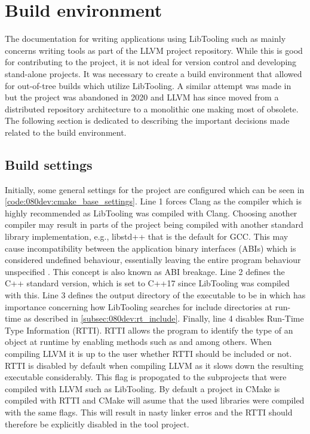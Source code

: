 \section{Build environment}

The documentation for writing applications using LibTooling such as \cite{MatchingClangAST, ClangTransformerTutorial} mainly concerns writing tools as part of the LLVM project repository. While this is good for contributing to the project, it is not ideal for version control and developing stand-alone projects.
It was necessary to create a build environment that allowed for out-of-tree builds which utilize LibTooling. A similar attempt was made in \cite{kasmisClangOutoftreeBuild2023} but the project was abandoned in 2020 and LLVM has since moved from a distributed repository architecture to a monolithic one making most of \cite{kasmisClangOutoftreeBuild2023} obsolete.
The following section is dedicated to describing the important decisions made related to the build environment.

\subsection{Build settings}

Initially, some general settings for the project are configured which can be seen in \cref{code:080dev:cmake_base_settings}.
Line 1 forces Clang as the compiler which is highly recommended as LibTooling was compiled with Clang. Choosing another compiler may result in parts of the project being compiled with another standard library implementation, e.g., libstd++ that is the default for GCC. This may cause incompatibility between the application binary interfaces (ABIs) which is considered undefined behaviour, essentially leaving the entire program behaviour unspecified \cite{cppreferenceUndefinedBehaviorCppreference}. This concept is also known as ABI breakage.
Line 2 defines the C++ standard version, which is set to C++17 since LibTooling was compiled with this.
Line 3 defines the output directory of the executable to be in  which has importance concerning how LibTooling searches for include directories at run-time as described in \cref{subsec:080dev:rt_include}.
Finally, line 4 disables Run-Time Type Information (RTTI). RTTI allows the program to identify the type of an object at runtime by enabling methods such as  and  among others. When compiling LLVM it is up to the user whether RTTI should be included or not. RTTI is disabled by default when compiling LLVM as it slows down the resulting executable considerably. This flag is propogated to the subprojects that were compiled with LLVM such as LibTooling. By default a project in CMake is compiled with RTTI and CMake will asume that the used libraries were compiled with the same flags. This will result in nasty linker erros and the RTTI should therefore be explicitly disabled in the tool project.

